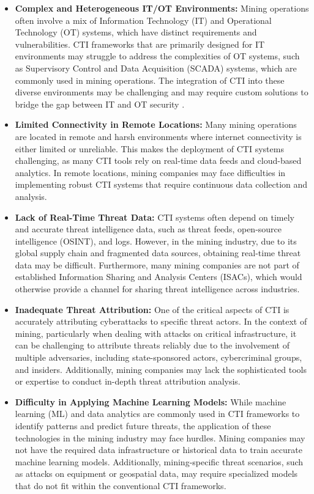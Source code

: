 \documentclass[a4paper,twoside,12pt]{report}
\begin{document}
\begin{itemize}
    \item \textbf{Complex and Heterogeneous IT/OT Environments:} Mining operations often involve a mix of Information Technology (IT) and Operational Technology (OT) systems, which have distinct requirements and vulnerabilities. CTI frameworks that are primarily designed for IT environments may struggle to address the complexities of OT systems, such as Supervisory Control and Data Acquisition (SCADA) systems, which are commonly used in mining operations. The integration of CTI into these diverse environments may be challenging and may require custom solutions to bridge the gap between IT and OT security \citep{wang2013cyber}.
    
    \item \textbf{Limited Connectivity in Remote Locations:} Many mining operations are located in remote and harsh environments where internet connectivity is either limited or unreliable. This makes the deployment of CTI systems challenging, as many CTI tools rely on real-time data feeds and cloud-based analytics. In remote locations, mining companies may face difficulties in implementing robust CTI systems that require continuous data collection and analysis.
    
    \item \textbf{Lack of Real-Time Threat Data:} CTI systems often depend on timely and accurate threat intelligence data, such as threat feeds, open-source intelligence (OSINT), and logs. However, in the mining industry, due to its global supply chain and fragmented data sources, obtaining real-time threat data may be difficult. Furthermore, many mining companies are not part of established Information Sharing and Analysis Centers (ISACs), which would otherwise provide a channel for sharing threat intelligence across industries.
    
    \item \textbf{Inadequate Threat Attribution:} One of the critical aspects of CTI is accurately attributing cyberattacks to specific threat actors. In the context of mining, particularly when dealing with attacks on critical infrastructure, it can be challenging to attribute threats reliably due to the involvement of multiple adversaries, including state-sponsored actors, cybercriminal groups, and insiders. Additionally, mining companies may lack the sophisticated tools or expertise to conduct in-depth threat attribution analysis.
    
    \item \textbf{Difficulty in Applying Machine Learning Models:} While machine learning (ML) and data analytics are commonly used in CTI frameworks to identify patterns and predict future threats, the application of these technologies in the mining industry may face hurdles. Mining companies may not have the required data infrastructure or historical data to train accurate machine learning models. Additionally, mining-specific threat scenarios, such as attacks on equipment or geospatial data, may require specialized models that do not fit within the conventional CTI frameworks.
    

\end{itemize}
\end{document}
